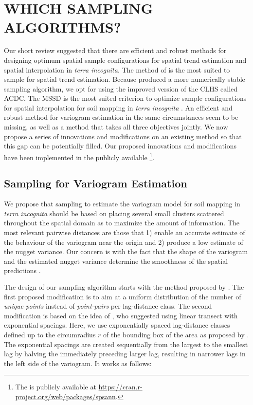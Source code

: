 \section{WHICH SAMPLING ALGORITHMS?}

\def\footspsann{\footnote{The \Rpackage{spsann} is publicly available at 
\url{https://cran.r-project.org/web/packages/spsann}.}}

Our short review suggested that there are efficient and robust methods for designing optimum spatial sample 
configurations for spatial trend estimation and spatial interpolation in \emph{terra incognita}. The method of 
\citet{MinasnyEtAl2006b} is the most suited to sample for spatial trend estimation. Because 
\citet{Samuel-RosaEtAl2016} produced a more numerically stable sampling algorithm, we opt for using the 
improved version of the CLHS called ACDC. The MSSD is the most suited criterion to optimize sample 
configurations for spatial interpolation for soil mapping in \emph{terra incognita} \cite{BrusEtAl2006, 
WalvoortEtAl2010}. An efficient and robust method for variogram estimation in the same circumstances seem to 
be missing, as well as a method that takes all three objectives jointly. We now propose a series of 
innovations and modifications on an existing method so that this gap can be potentially filled. Our proposed 
innovations and modifications have been implemented in the publicly available \footspsann.

\subsection{Sampling for Variogram Estimation}

We propose that sampling to estimate the variogram model for soil mapping in \emph{terra incognita} should be 
based on placing several small clusters scattered throughout the spatial domain as to maximize the amount of 
information. The most relevant pairwise distances are those that 1) enable an accurate estimate of the 
behaviour of the variogram near the origin and 2) produce a low estimate of the nugget variance. Our concern 
is with the fact that the shape of the variogram and the estimated nugget variance determine the smoothness of 
the spatial predictions \cite{WebsterEtAl2007}.

The design of our sampling algorithm starts with the method proposed by \citet{WarrickEtAl1987}. The first 
proposed modification is to aim at a uniform distribution of the number of \emph{unique points} instead of 
\emph{point-pairs} per lag-distance class. The second modification is based on the idea of 
\citet{PettittEtAl1993a}, who suggested using linear transect with exponential spacings. Here, we use 
exponentially spaced lag-distance classes defined up to the circumradius $r$ of the bounding box of the area 
as proposed by \citet{TruongEtAl2013}. The exponential spacings are created sequentially from the largest to 
the smallest lag by halving the immediately preceding larger lag, resulting in narrower lags in the left 
side of the variogram. It works as follows:


